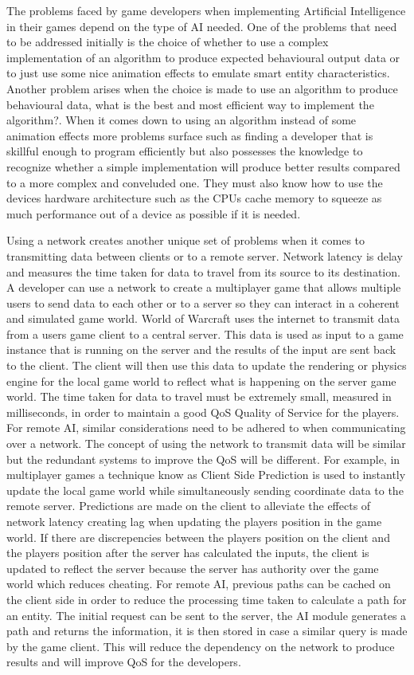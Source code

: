 \documentclass[12pt,a4paper,titlepage]{article}
\begin{document}
The problems faced by game developers when implementing Artificial Intelligence in their games depend on the type of AI needed. One of the problems that need to be addressed initially is the choice of whether to use a complex implementation of an algorithm to produce expected behavioural output data or to just use some nice animation effects to emulate smart entity characteristics. Another problem arises when the choice is made to use an algorithm to produce behavioural data, what is the best and most efficient way to implement the algorithm?. When it comes down to using an algorithm instead of some animation effects more problems surface such as finding a developer that is skillful enough to program efficiently but also possesses the knowledge to recognize whether a simple implementation will produce better results compared to a more complex and conveluded one. They must also know how to use the devices hardware architecture such as the CPUs cache memory to squeeze as much performance out of a device as possible if it is needed. 

Using a network creates another unique set of problems when it comes to transmitting data between clients or to a remote server. Network latency is delay and measures the time taken for data to travel from its source to its destination\cite{networklatency}. A developer can use a network to create a multiplayer game that allows multiple users to send data to each other or to a server so they can interact in a coherent and simulated game world. World of Warcraft\cite{worldofwarcraft} uses the internet to transmit data from a users game client to a central server. This data is used as input to a game instance that is running on the server and the results of the input are sent back to the client. The client will then use this data to update the rendering or physics engine for the local game world to reflect what is happening on the server game world. The time taken for data to travel must be extremely small, measured in milliseconds, in order to maintain a good QoS Quality of Service for the players. For remote AI, similar considerations need to be adhered to when communicating over a network. The concept of using the network to transmit data will be similar but the redundant systems to improve the QoS will be different. For example, in multiplayer games a technique know as Client Side Prediction is used to instantly update the local game world while simultaneously sending coordinate data to the remote server. Predictions are made on the client to alleviate the effects of network latency creating lag when updating the players position in the game world. If there are discrepencies between the players position on the client and the players position after the server has calculated the inputs, the client is updated to reflect the server because the server has authority over the game world which reduces cheating. For remote AI, previous paths can be cached on the client side in order to reduce the processing time taken to calculate a path for an entity. The initial request can be sent to the server, the AI module generates a path and returns the information, it is then stored in case a similar query is made by the game client. This will reduce the dependency on the network to produce results and will improve QoS for the developers. 
\end{document}

